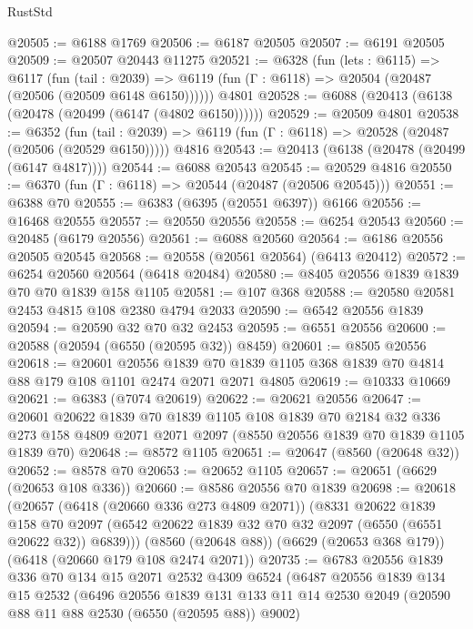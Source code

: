 \begin{lexlean}{RustStd}
\begin{coremodule}
@20505 := @6188 @1769
@20506 := @6187 @20505
@20507 := @6191 @20505
@20509 := @20507 @20443 @11275
@20521 := @6328
    (fun (lets : @6115) =>
    @6117
      (fun (tail : @2039) =>
      @6119 (fun (Γ : @6118) => @20504 (@20487 (@20506 (@20509 @6148 @6150))))))
    @4801
@20528 := @6088 (@20413 (@6138 (@20478 (@20499 (@6147 (@4802 @6150))))))
@20529 := @20509 @4801
@20538 := @6352
    (fun (tail : @2039) => @6119 (fun (Γ : @6118) => @20528 (@20487 (@20506 (@20529 @6150)))))
    @4816
@20543 := @20413 (@6138 (@20478 (@20499 (@6147 @4817))))
@20544 := @6088 @20543
@20545 := @20529 @4816
@20550 := @6370 (fun (Γ : @6118) => @20544 (@20487 (@20506 @20545)))
@20551 := @6388 @70
@20555 := @6383 (@6395 (@20551 @6397)) @6166
@20556 := @16468 @20555
@20557 := @20550 @20556
@20558 := @6254 @20543
@20560 := @20485 (@6179 @20556)
@20561 := @6088 @20560
@20564 := @6186 @20556 @20505 @20545
@20568 := @20558 (@20561 @20564) (@6413 @20412)
@20572 := @6254 @20560 @20564 (@6418 @20484)
@20580 := @8405 @20556 @1839 @1839 @70 @70 @1839 @158 @1105
@20581 := @107 @368
@20588 := @20580 @20581 @2453 @4815 @108 @2380 @4794 @2033
@20590 := @6542 @20556 @1839
@20594 := @20590 @32 @70 @32 @2453
@20595 := @6551 @20556
@20600 := @20588 (@20594 (@6550 (@20595 @32)) @8459)
@20601 := @8505 @20556
@20618 := @20601
    @20556
    @1839
    @70
    @1839
    @1105
    @368
    @1839
    @70
    @4814
    @88
    @179
    @108
    @1101
    @2474
    @2071
    @2071
    @4805
@20619 := @10333 @10669
@20621 := @6383 (@7074 @20619)
@20622 := @20621 @20556
@20647 := @20601
    @20622
    @1839
    @70
    @1839
    @1105
    @108
    @1839
    @70
    @2184
    @32
    @336
    @273
    @158
    @4809
    @2071
    @2071
    @2097
    (@8550 @20556 @1839 @70 @1839 @1105 @1839 @70)
@20648 := @8572 @1105
@20651 := @20647 (@8560 (@20648 @32))
@20652 := @8578 @70
@20653 := @20652 @1105
@20657 := @20651 (@6629 (@20653 @108 @336))
@20660 := @8586 @20556 @70 @1839
@20698 := @20618
    (@20657
      (@6418 (@20660 @336 @273 @4809 @2071))
      (@8331
        @20622
        @1839
        @158
        @70
        @2097
        (@6542 @20622 @1839 @32 @70 @32 @2097 (@6550 (@6551 @20622 @32)) @6839)))
    (@8560 (@20648 @88))
    (@6629 (@20653 @368 @179))
    (@6418 (@20660 @179 @108 @2474 @2071))
@20735 := @6783
    @20556
    @1839
    @336
    @70
    @134
    @15
    @2071
    @2532
    @4309
    @6524
    (@6487
      @20556
      @1839
      @134
      @15
      @2532
      (@6496
        @20556
        @1839
        @131
        @133
        @11
        @14
        @2530
        @2049
        (@20590 @88 @11 @88 @2530 (@6550 (@20595 @88)) @9002)

\end{coremodule}
\end{lexlean}
